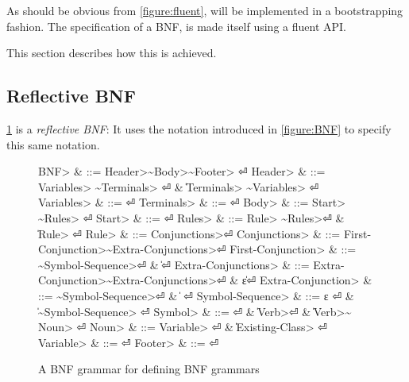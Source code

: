 As should be obvious from \cref{figure:fluent}, \Fajita will be implemented
in a bootstrapping fashion.
The specification of a BNF, is made itself using a fluent API.

This section describes how this is achieved.

\subsection{Reflective BNF}
\cref{figure:BNF:BNF} is a \emph{reflective BNF}:
It uses the notation introduced in \cref{figure:BNF}
to specify this same notation.

\begin{figure}
  \begin{Grammar}
    \begin{aligned}
      \<BNF>                & ::= \<Header>\~\<Body>\~\<Footer> \hfill⏎
      \<Header>             & ::= \<Variables> \~\<Terminals> \hfill⏎
      {}                    & \| \<Terminals> \~\<Variables> \hfill⏎
      \<Variables>          & ::= \hfill⏎
      \<Terminals>          & ::= \hfill⏎
      \<Body>               & ::= \<Start> \~\<Rules> \hfill⏎
      \<Start>              & ::=  \hfill⏎
      \<Rules>              & ::= \<Rule> \~\<Rules>\hfill⏎
      {}                    & \| \<Rule> \hfill⏎
      \<Rule>               & ::=  \<Conjunctions>\hfill⏎
      \<Conjunctions>       & ::= \<First-Conjunction>\~\<Extra-Conjunctions>\hfill⏎
      \<First-Conjunction>  & ::= \~\<Symbol-Sequence>\hfill⏎
      {}                    & \| \hfill⏎
      \<Extra-Conjunctions> & ::= \<Extra-Conjunction>\~\<Extra-Conjunctions>\hfill⏎
      {}                    & \| ε\hfill⏎
      \<Extra-Conjunction>  & ::= \~\<Symbol-Sequence>\hfill⏎
      {}                    & \|  \hfill⏎
      \<Symbol-Sequence>    & ::= ε \hfill⏎
      {}                    & \| \~\<Symbol-Sequence> \hfill⏎
      \<Symbol>             & ::=  \hfill⏎
      {}                    & \| \<Verb>\hfill⏎
      {}                    & \| \<Verb>\~\cc{,} \<Noun> \hfill⏎
      \<Noun>               & ::= \<Variable> \hfill⏎
      {}                    & \| \<Existing-Class> \hfill⏎
      \<Variable>           & ::=  \hfill⏎
      \<Footer>             & ::= \hfill⏎
    \end{aligned}
  \end{Grammar}
  \caption{A BNF grammar for defining BNF grammars}
  \label{figure:BNF:BNF}
\end{figure}
\begin{comment}
Note that this specification can only be approximate;
the figure uses verbs as replacement to indentation,
and special symbols such as~$|$,~$::-$ and~$ε$.
\end{comment}

